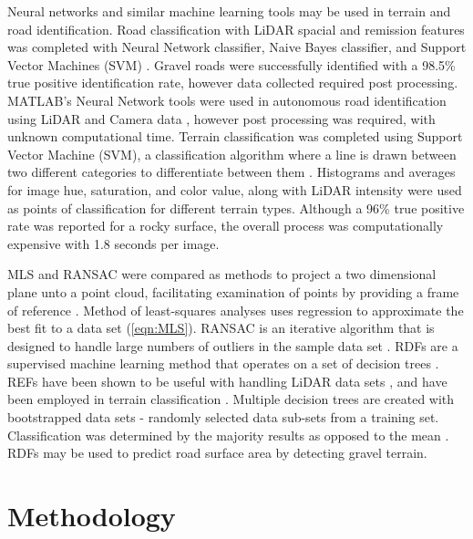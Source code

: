 \documentclass[journal,onecolumn]{IEEEtran}
\begin{document}
	{Neural networks and similar machine learning tools may be used in terrain and road identification. Road classification with LiDAR spacial and remission features was completed with Neural Network classifier, Naive Bayes classifier, and Support Vector Machines (SVM) \cite{wang_road_nodate,wang_two-stage_2018}. Gravel roads were successfully identified with a 98.5\% true positive identification rate, however data collected required post processing. MATLAB's Neural Network tools were used in autonomous road identification using LiDAR and Camera data \cite{rasmussen_combining_2002}, however post processing was required, with unknown computational time.  Terrain classification was completed using Support Vector Machine (SVM), a classification algorithm where a line is drawn between two different categories to differentiate between them \cite{breiman_random_2001}. Histograms and averages for image hue, saturation, and color value, along with LiDAR intensity were used as points of classification for different terrain types. Although a 96\% true positive rate was reported for a rocky surface, the overall process was computationally expensive with 1.8 seconds per image.}
	
	{MLS and RANSAC were compared as methods to project a two dimensional plane unto a point cloud, facilitating examination of points by providing a frame of reference \cite{miller_method_nodate, gojcic_perfect_2019}. Method of least-squares analyses uses regression to approximate the best fit to a data set (\ref{eqn:MLS}). RANSAC is an iterative algorithm that is designed to handle large numbers of outliers in the sample data set \cite{derpanis_overview_nodate,yaniv_random_2010,fischler_random_1987,cantzler_random_nodate}. 
	RDFs are a supervised machine learning method that operates on a set of decision trees \cite{ho_random_1995}. REFs have been shown to be useful with handling LiDAR data sets \cite{breiman_random_2001}, and have been employed in terrain classification \cite{laible_3d_2012,laible_map_building,laible_terrain_2013,khan_high_2011,reymann_improving_2015,schilling_geometric_2017, wietrzykowski_context-aware_2019}. Multiple decision trees are created with bootstrapped data sets - randomly selected data sub-sets from a training set. Classification was determined by the majority results as opposed to the mean \cite{breiman_random_2001,ho_random_1995}. RDFs may be used to predict road surface area by detecting gravel terrain.}

\section{Methodology}
\end{document}

